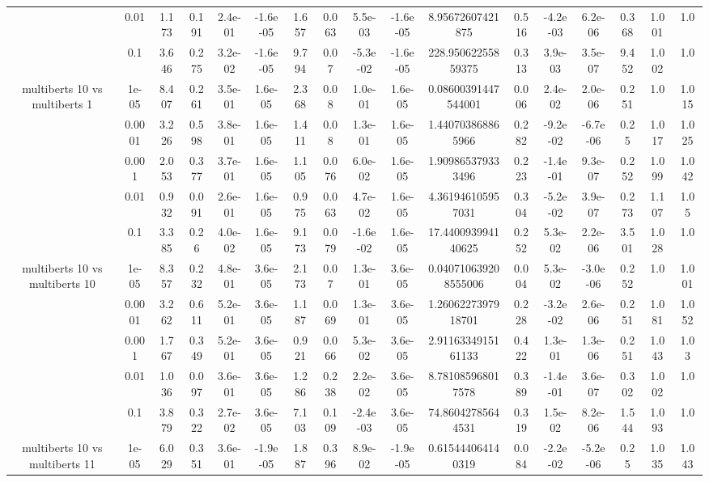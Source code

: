 \begin{tabular}{|c|c|c|c|c|c|c|c|c|c|c|c|c|c|c|c|c|}
 & 0.01 & 1.173 & 0.191 & 2.4e-01 & -1.6e-05 & 1.657 & 0.063 & 5.5e-03 & -1.6e-05 & 8.95672607421875 & 0.516 & -4.2e-03 & 6.2e-06 & 0.368 & 1.001 & 1.0 \\
 & 0.1 & 3.646 & 0.275 & 3.2e-02 & -1.6e-05 & 9.794 & 0.07 & -5.3e-02 & -1.6e-05 & 228.95062255859375 & 0.313 & 3.9e-03 & 3.5e-07 & 9.452 & 1.002 & 1.0 \\
\hline
\multirow{5}{*}{multiberts 10 vs multiberts 1} & 1e-05 & 8.407 & 0.261 & 3.5e-01 & 1.6e-05 & 2.368 & 0.08 & 1.0e-01 & 1.6e-05 & 0.08600391447544001 & 0.006 & 2.4e-02 & 2.0e-06 & 0.251 & 1.0 & 1.015 \\
 & 0.0001 & 3.226 & 0.598 & 3.8e-01 & 1.6e-05 & 1.411 & 0.08 & 1.3e-01 & 1.6e-05 & 1.440703868865966 & 0.282 & -9.2e-02 & -6.7e-06 & 0.25 & 1.017 & 1.025 \\
 & 0.001 & 2.053 & 0.377 & 3.7e-01 & 1.6e-05 & 1.105 & 0.076 & 6.0e-02 & 1.6e-05 & 1.909865379333496 & 0.223 & -1.4e-01 & 9.3e-07 & 0.252 & 1.099 & 1.042 \\
 & 0.01 & 0.932 & 0.091 & 2.6e-01 & 1.6e-05 & 0.975 & 0.063 & 4.7e-02 & 1.6e-05 & 4.361946105957031 & 0.304 & -5.2e-02 & 3.9e-07 & 0.273 & 1.107 & 1.05 \\
 & 0.1 & 3.385 & 0.26 & 4.0e-02 & 1.6e-05 & 9.173 & 0.079 & -1.6e-02 & 1.6e-05 & 17.440093994140625 & 0.252 & 5.3e-02 & 2.2e-06 & 3.501 & 1.028 & 1.0 \\
\hline
\multirow{5}{*}{multiberts 10 vs multiberts 10} & 1e-05 & 8.357 & 0.232 & 4.8e-01 & 3.6e-05 & 2.173 & 0.07 & 1.3e-01 & 3.6e-05 & 0.040710639208555006 & 0.004 & 5.3e-02 & -3.0e-06 & 0.252 & 1.0 & 1.001 \\
 & 0.0001 & 3.262 & 0.611 & 5.2e-01 & 3.6e-05 & 1.187 & 0.069 & 1.3e-01 & 3.6e-05 & 1.2606227397918701 & 0.228 & -3.2e-02 & 2.6e-06 & 0.251 & 1.081 & 1.052 \\
 & 0.001 & 1.767 & 0.349 & 5.2e-01 & 3.6e-05 & 0.921 & 0.066 & 5.3e-02 & 3.6e-05 & 2.9116334915161133 & 0.422 & 1.3e-01 & 1.3e-06 & 0.251 & 1.043 & 1.03 \\
 & 0.01 & 1.036 & 0.097 & 3.6e-01 & 3.6e-05 & 1.286 & 0.238 & 2.2e-02 & 3.6e-05 & 8.781085968017578 & 0.389 & -1.4e-01 & 3.6e-07 & 0.302 & 1.002 & 1.0 \\
 & 0.1 & 3.879 & 0.322 & 2.7e-02 & 3.6e-05 & 7.103 & 0.109 & -2.4e-03 & 3.6e-05 & 74.86042785644531 & 0.319 & 1.5e-02 & 8.2e-06 & 1.544 & 1.093 & 1.0 \\
\hline
\multirow{5}{*}{multiberts 10 vs multiberts 11} & 1e-05 & 6.029 & 0.351 & 3.6e-01 & -1.9e-05 & 1.887 & 0.396 & 8.9e-02 & -1.9e-05 & 0.615444064140319 & 0.084 & -2.2e-02 & -5.2e-06 & 0.25 & 1.035 & 1.043 \\

\end{tabular}
